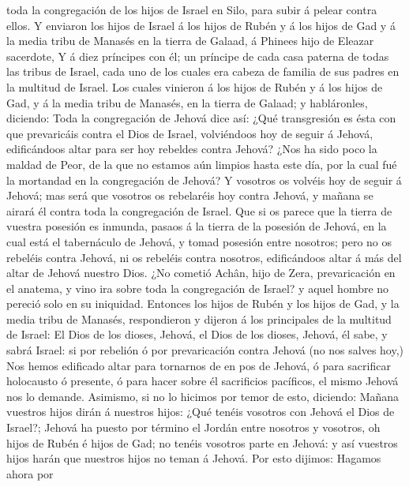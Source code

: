 toda la congregación de los hijos de Israel en Silo, para subir á pelear
contra ellos.  Y enviaron los hijos de Israel á los hijos
de Rubén y á los hijos de Gad y á la media tribu de Manasés en la tierra
de Galaad, á Phinees hijo de Eleazar sacerdote,  Y á diez
príncipes con él; un príncipe de cada casa paterna de todas las tribus
de Israel, cada uno de los cuales era cabeza de familia de sus padres en
la multitud de Israel.  Los cuales vinieron á los hijos
de Rubén y á los hijos de Gad, y á la media tribu de Manasés, en la
tierra de Galaad; y habláronles, diciendo:  Toda la
congregación de Jehová dice así: ¿Qué transgresión es ésta con que
prevaricáis contra el Dios de Israel, volviéndoos hoy de seguir á
Jehová, edificándoos altar para ser hoy rebeldes contra Jehová?
 ¿Nos ha sido poco la maldad de Peor, de la que no
estamos aún limpios hasta este día, por la cual fué la mortandad en la
congregación de Jehová?  Y vosotros os volvéis hoy de
seguir á Jehová; mas será que vosotros os rebelaréis hoy contra Jehová,
y mañana se airará él contra toda la congregación de Israel.
 Que si os parece que la tierra de vuestra posesión es
inmunda, pasaos á la tierra de la posesión de Jehová, en la cual está el
tabernáculo de Jehová, y tomad posesión entre nosotros; pero no os
rebeléis contra Jehová, ni os rebeléis contra nosotros, edificándoos
altar á más del altar de Jehová nuestro Dios.  ¿No
cometió Achân, hijo de Zera, prevaricación en el anatema, y vino ira
sobre toda la congregación de Israel? y aquel hombre no pereció solo en
su iniquidad.  Entonces los hijos de Rubén y los hijos de
Gad, y la media tribu de Manasés, respondieron y dijeron á los
principales de la multitud de Israel:  El Dios de los
dioses, Jehová, el Dios de los dioses, Jehová, él sabe, y sabrá Israel:
si por rebelión ó por prevaricación contra Jehová (no nos salves hoy,)
 Nos hemos edificado altar para tornarnos de en pos de
Jehová, ó para sacrificar holocausto ó presente, ó para hacer sobre él
sacrificios pacíficos, el mismo Jehová nos lo demande. 
Asimismo, si no lo hicimos por temor de esto, diciendo: Mañana vuestros
hijos dirán á nuestros hijos: ¿Qué tenéis vosotros con Jehová el Dios de
Israel?;  Jehová ha puesto por término el Jordán entre
nosotros y vosotros, oh hijos de Rubén é hijos de Gad; no tenéis
vosotros parte en Jehová: y así vuestros hijos harán que nuestros hijos
no teman á Jehová.  Por esto dijimos: Hagamos ahora por
